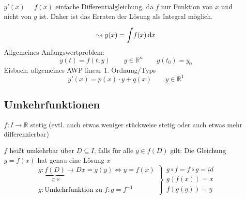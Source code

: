 
\noindent $y'(x) = f(x)$ einfache Differentialgleichung, da $f$ nur Funktion von $x$ und nicht von $y$ ist.
Daher ist das Erraten der Lösung als Integral möglich.

\begin{equation*}\leadsto y(x) = \int \! f(x) \, \mathrm d x\end{equation*}
Allgemeines Anfangswertproblem:
\begin{equation*}\dot y(t) = f(t, y) \qquad y \in \mathbb{R}^n \qquad y(t_0) = y_0\end{equation*}
Eisbach: allgemeines AWP linear 1. Ordnung/Typs
\[ y'(x) = p(x)\cdot y + q(x)\qquad y \in \mathbb{R}^1 \]

\subsection{Umkehrfunktionen}
$f: I \to \mathbb{R}$ stetig (evtl. auch etwas weniger stückweise stetig oder auch etwas mehr differenzierbar)

\begin{definition}[Umkehrbarkeit]
    $f$ heißt umkehrbar über $D \subseteq I$, falls für alle $y \in f(D)$ gilt:
    Die Gleichung $y=f(x)$ hat genau eine Lösung $x$
    \begin{equation*}
        \left.
        \begin{array}{r}
            g:\underbrace{f(D)}_{\subseteq \mathbb{R}} \to D x= g(y) \Leftrightarrow y=f(x) \\
            g: \text{Umkehrfunktion zu }f: g=f^{-1}
        \end{array}
        \right\}
        \begin{array}{l}
            g \circ f = f \circ g = id\\
            g(f(x)) = x\\
            f(g(y)) = y
        \end{array}
    \end{equation*}
\end{definition}

